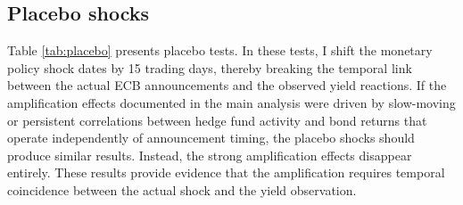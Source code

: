 \documentclass[english, 11pt, oneside]{article}
\begin{document}
\clearpage
\subsection{Placebo shocks}

Table \ref{tab:placebo} presents placebo tests. In these tests, I shift the monetary policy shock dates by 15 trading days, thereby breaking the temporal link between the actual ECB announcements and the observed yield reactions. If the amplification effects documented in the main analysis were driven by slow-moving or persistent correlations between hedge fund activity and bond returns that operate independently of announcement timing, the placebo shocks should produce similar results. Instead, the strong amplification effects disappear entirely. These results provide evidence that the amplification requires temporal coincidence between the actual shock and the yield observation.
\end{document}
